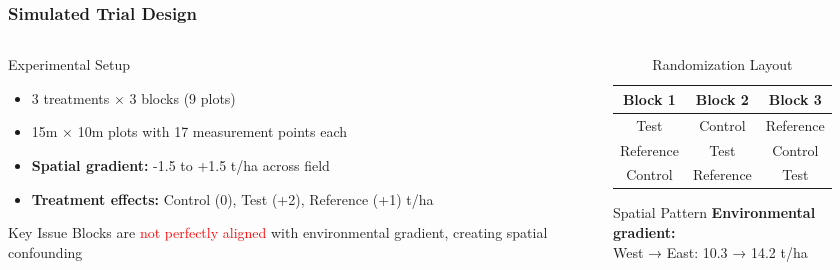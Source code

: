 \documentclass[aspectratio=43]{beamer}
\begin{document}
\begin{frame}
    \frametitle{Simulated Trial Design}
    
    \begin{columns}[T]
        \begin{column}{0.6\textwidth}
            \begin{block}{Experimental Setup}
                \begin{itemize}
                    \item 3 treatments × 3 blocks (9 plots)
                    \item 15m × 10m plots with 17 measurement points each
                    \item \textbf{Spatial gradient:} -1.5 to +1.5 t/ha across field
                    \item \textbf{Treatment effects:} Control (0), Test (+2), Reference (+1) t/ha
                \end{itemize}
            \end{block}
            
            \begin{block}{Key Issue}
                Blocks are \textcolor{red}{not perfectly aligned} with environmental gradient, creating spatial confounding
            \end{block}
        \end{column}
        
        \begin{column}{0.4\textwidth}
            \begin{table}[h]
                \centering
                \scriptsize
                \begin{tabular}{|c|c|c|}
                    \hline
                    \rowcolor{lightblue} \textbf{Block 1} & \textbf{Block 2} & \textbf{Block 3} \\
                    \hline
                    Test & Control & Reference \\
                    Reference & Test & Control \\
                    Control & Reference & Test \\
                    \hline
                \end{tabular}
                \caption{Randomization Layout}
            \end{table}
            
            \vspace{0.5em}
            
            \begin{block}{Spatial Pattern}
                \small
                \textbf{Environmental gradient:}\\
                West → East: 10.3 → 14.2 t/ha
            \end{block}
        \end{column}
    \end{columns}
\end{frame}
\end{document}
